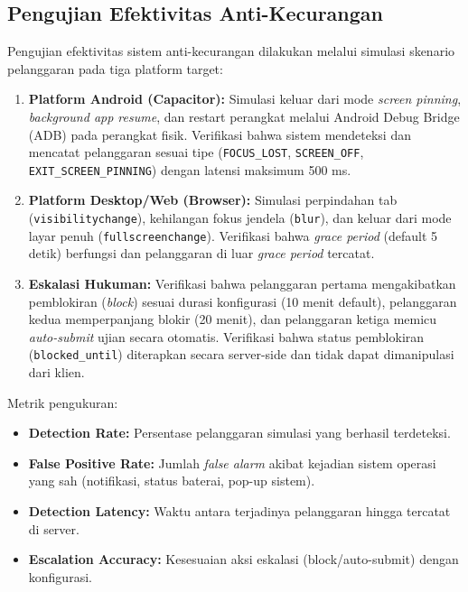 \subsection{Pengujian Efektivitas Anti-Kecurangan}

Pengujian efektivitas sistem anti-kecurangan dilakukan melalui simulasi skenario pelanggaran pada tiga platform target:

\begin{enumerate}
	\item \textbf{Platform Android (Capacitor):} Simulasi keluar dari mode \textit{screen pinning}, \textit{background app resume}, dan restart perangkat melalui Android Debug Bridge (ADB) pada perangkat fisik. Verifikasi bahwa sistem mendeteksi dan mencatat pelanggaran sesuai tipe (\texttt{FOCUS\_LOST}, \texttt{SCREEN\_OFF}, \texttt{EXIT\_SCREEN\_PINNING}) dengan latensi maksimum 500 ms.

	\item \textbf{Platform Desktop/Web (Browser):} Simulasi perpindahan tab (\texttt{visibilitychange}), kehilangan fokus jendela (\texttt{blur}), dan keluar dari mode layar penuh (\texttt{fullscreenchange}). Verifikasi bahwa \textit{grace period} (default 5 detik) berfungsi dan pelanggaran di luar \textit{grace period} tercatat.

	\item \textbf{Eskalasi Hukuman:} Verifikasi bahwa pelanggaran pertama mengakibatkan pemblokiran (\textit{block}) sesuai durasi konfigurasi (10 menit default), pelanggaran kedua memperpanjang blokir (20 menit), dan pelanggaran ketiga memicu \textit{auto-submit} ujian secara otomatis. Verifikasi bahwa status pemblokiran (\texttt{blocked\_until}) diterapkan secara server-side dan tidak dapat dimanipulasi dari klien.
\end{enumerate}

Metrik pengukuran:
\begin{itemize}
	\item \textbf{Detection Rate:} Persentase pelanggaran simulasi yang berhasil terdeteksi.
	\item \textbf{False Positive Rate:} Jumlah \textit{false alarm} akibat kejadian sistem operasi yang sah (notifikasi, status baterai, pop-up sistem).
	\item \textbf{Detection Latency:} Waktu antara terjadinya pelanggaran hingga tercatat di server.
	\item \textbf{Escalation Accuracy:} Kesesuaian aksi eskalasi (block/auto-submit) dengan konfigurasi.
\end{itemize}


